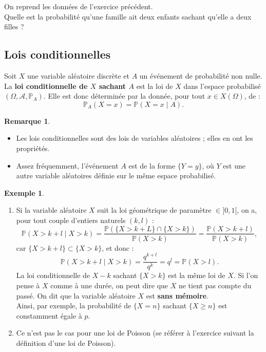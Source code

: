\documentclass[french]{article}
\renewcommand{\P}{\mathbb{P}}
\theoremstyle{plain}
\theoremstyle{definition}
\newtheorem*{ex}{Exemple}
\newtheorem*{rmq}{Remarque}
\theoremstyle{remark}
\begin{document}
\begin{exo}
	On reprend les données de l'exercice précédent.\\
	Quelle est la probabilité qu'une famille ait deux enfants sachant qu'elle a deux filles ?
\end{exo}

\subsection{Lois conditionnelles}

\begin{dfn}
	Soit $X$ une variable aléatoire discrète et $A$ un événement de probabilité non nulle.\\
	La \textbf{loi conditionnelle de $X$ sachant $A$} est la loi de $X$ dans l'espace probabilisé $(\Omega,\mathcal{A},\P_A)$. Elle est donc déterminée par la donnée, pour tout $x\in X(\Omega)$, de :
	$$\P_A(X=x)=\P(X=x\mid A).$$
\end{dfn}

\begin{rmq}
	\begin{itemize}
		\item Les lois conditionnelles sont des lois de variables aléatoires ; elles en ont les propriétés.
		\item Assez fréquemment, l'événement $A$ est de la forme $\{Y=y\}$, où $Y$ est une autre variable aléatoires définie sur le même espace probabilisé.
	\end{itemize}
\end{rmq}

\begin{ex}
	\begin{enumerate}
		\item Si la variable aléatoire $X$ suit la loi géométrique de paramètre $\in]0,1[$, on a, pour tout couple d'entiers naturels $(k,l)$ : $$\P(X>k+l\mid X>k)=\frac{\P(\{X>k+L\}\cap\{X>k\})}{\P(X>k)}=\frac{\P(X>k+l)}{\P(X>k)},$$ car $\{X>k+l\}\subset\{X>k\}$, et donc : $$\P(X>k+l\mid X>k)=\frac{q^{k+l}}{q^k}=q^l=\P(X>l).$$ La loi conditionnelle de $X-k$ sachant $\{X>k\}$ est la même loi de $X$. Si l'on pense à $X$ comme à une durée, on peut dire que $X$ ne tient pas compte du passé. On dit que la variable aléatoire $X$ est \textbf{sans mémoire}.\\
		Ainsi, par exemple, la probabilité de $\{X=n\}$ sachant $\{X\geqslant n\}$ est constamment égale à $p$.
		\item Ce n'est pas le cas pour une loi de Poisson (se référer à l'exercice suivant la définition d'une loi de Poisson).
	\end{enumerate}
\end{ex}
\end{document}

